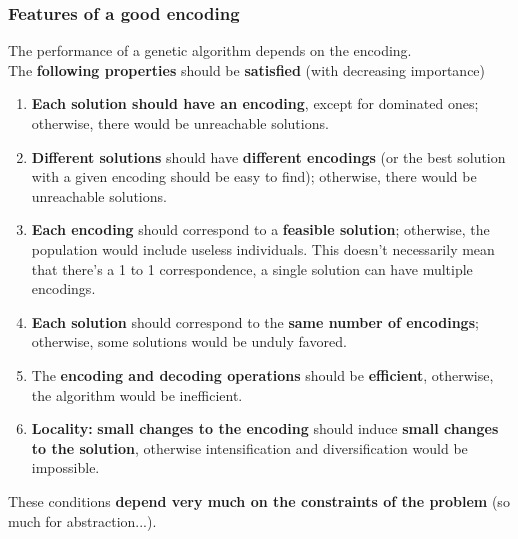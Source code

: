 \newpage

\subsubsection{Features of a good encoding}
The performance of a genetic algorithm depends on the encoding.\\

The \textbf{following properties} should be \textbf{satisfied} (with decreasing importance)
\begin{enumerate}
	\item \textbf{Each solution should have an encoding}, except for dominated ones; otherwise, there would be unreachable solutions.\\
	
	\item \textbf{Different solutions} should have \textbf{different encodings} (or the best solution with a given encoding should be easy to find); otherwise, there would be unreachable solutions. \\
	
	\item \textbf{Each encoding} should correspond to a \textbf{feasible solution}; otherwise, the population would include useless individuals. This doesn't necessarily mean that there's a 1 to 1 correspondence, a single solution can have multiple encodings.\\
	
	\item \textbf{Each solution} should correspond to the \textbf{same number of encodings}; otherwise, some solutions would be unduly favored.\\
	
	\item The \textbf{encoding and decoding operations} should be \textbf{efficient}, otherwise, the algorithm would be inefficient.\\
	
	\item \textbf{Locality:} \textbf{small changes to the encoding} should induce \textbf{small changes to the solution}, otherwise intensification and diversification would be impossible.\\
\end{enumerate}

These conditions \textbf{depend very much on the constraints of the problem} (so much for abstraction...).\\

\newpage

